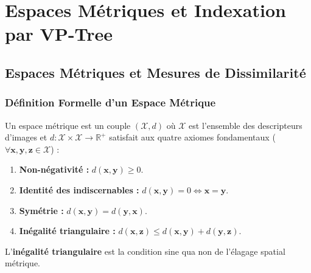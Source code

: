 \chapter{Espaces Métriques et Indexation par VP-Tree}
\label{chap:metriques_vptree}

\section{Espaces Métriques et Mesures de Dissimilarité}

\subsection{Définition Formelle d'un Espace Métrique}
Un espace métrique est un couple $(\mathcal{X}, d)$ où $\mathcal{X}$ est l'ensemble des descripteurs d'images et $d : \mathcal{X} \times \mathcal{X} \to \mathbb{R}^+$ satisfait aux quatre axiomes fondamentaux ($\forall \mathbf{x}, \mathbf{y}, \mathbf{z} \in \mathcal{X}$) :
\begin{enumerate}[nosep]
    \item \textbf{Non-négativité :} $d(\mathbf{x}, \mathbf{y}) \ge 0$.
    \item \textbf{Identité des indiscernables :} $d(\mathbf{x}, \mathbf{y}) = 0 \iff \mathbf{x} = \mathbf{y}$.
    \item \textbf{Symétrie :} $d(\mathbf{x}, \mathbf{y}) = d(\mathbf{y}, \mathbf{x})$.
    \item \textbf{Inégalité triangulaire :} $d(\mathbf{x}, \mathbf{z}) \le d(\mathbf{x}, \mathbf{y}) + d(\mathbf{y}, \mathbf{z})$.
\end{enumerate}
L'\textbf{inégalité triangulaire} est la condition sine qua non de l'élagage spatial métrique.

